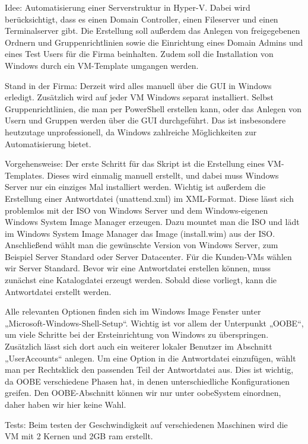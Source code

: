 \documentclass[conference]{IEEEtran}
\begin{document}
Idee:
Automatisierung einer Serverstruktur in Hyper-V. Dabei wird berücksichtigt, dass es einen Domain Controller, einen Fileserver und einen Terminalserver gibt. Die Erstellung soll außerdem das Anlegen von freigegebenen Ordnern und Gruppenrichtlinien sowie die Einrichtung eines Domain Admins und eines Test Users für die Firma beinhalten. Zudem soll die Installation von Windows durch ein VM-Template umgangen werden.

Stand in der Firma:
Derzeit wird alles manuell über die GUI in Windows erledigt. Zusätzlich wird auf jeder VM Windows separat installiert. Selbst Gruppenrichtlinien, die man per PowerShell erstellen kann, oder das Anlegen von Usern und Gruppen werden über die GUI durchgeführt. Das ist insbesondere heutzutage unprofessionell, da Windows zahlreiche Möglichkeiten zur Automatisierung bietet.

Vorgehensweise:
Der erste Schritt für das Skript ist die Erstellung eines VM-Templates. Dieses wird einmalig manuell erstellt, und dabei muss Windows Server nur ein einziges Mal installiert werden. Wichtig ist außerdem die Erstellung einer Antwortdatei (unattend.xml) im XML-Format. Diese lässt sich problemlos mit der ISO von Windows Server und dem Windows-eigenen Windows System Image Manager erzeugen. Dazu mountet man die ISO und lädt im Windows System Image Manager das Image (install.wim) aus der ISO. Anschließend wählt man die gewünschte Version von Windows Server, zum Beispiel Server Standard oder Server Datacenter. Für die Kunden-VMs wählen wir Server Standard. Bevor wir eine Antwortdatei erstellen können, muss zunächst eine Katalogdatei erzeugt werden. Sobald diese vorliegt, kann die Antwortdatei erstellt werden.

Alle relevanten Optionen finden sich im Windows Image Fenster unter „Microsoft-Windows-Shell-Setup“. Wichtig ist vor allem der Unterpunkt „OOBE“, um viele Schritte bei der Ersteinrichtung von Windows zu überspringen. Zusätzlich lässt sich dort auch ein weiterer lokaler Benutzer im Abschnitt „UserAccounts“ anlegen. Um eine Option in die Antwortdatei einzufügen, wählt man per Rechtsklick den passenden Teil der Antwortdatei aus. Dies ist wichtig, da OOBE verschiedene Phasen hat, in denen unterschiedliche Konfigurationen greifen. Den OOBE-Abschnitt können wir nur unter oobeSystem einordnen, daher haben wir hier keine Wahl.

Tests:
Beim testen der Geschwindigkeit auf verschiedenen Maschinen wird die VM mit 2 Kernen und 2GB ram erstellt.


\end{document}
